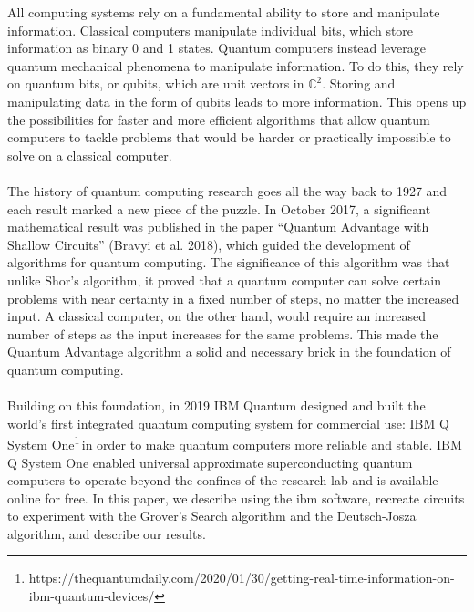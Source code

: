 \documentclass[12pt]{article}
\newcommand{\ibm}{\footnote{https://thequantumdaily.com/2020/01/30/getting-real-time-information-on-ibm-quantum-devices/}}
\begin{document}
    
    \noindent
    All computing systems rely on a fundamental ability to store and manipulate information. Classical computers manipulate individual bits, which store information as binary 0 and 1 states. Quantum computers instead leverage quantum mechanical phenomena to manipulate information. To do this, they rely on quantum bits, or qubits, which are unit vectors in $\mathbb{C}^2$. Storing and manipulating data in the form of qubits leads to more information. This opens up the possibilities for faster and more efficient algorithms that allow quantum computers to tackle problems that would be harder or practically impossible to solve on a classical computer.
    \\
    \smallskip
    \\
    The history of quantum computing research goes all the way back to 1927 and each result marked a new piece of the puzzle. In October 2017, a significant mathematical result was published in the paper “Quantum Advantage with Shallow Circuits” (Bravyi et al. 2018), which guided the development of algorithms for quantum computing. The significance of this algorithm was that unlike Shor’s algorithm, it proved that a quantum computer can solve certain problems with near certainty in a fixed number of steps, no matter the increased input. A classical computer, on the other hand,  would require an increased number of steps as the input increases for the same problems. This made the Quantum Advantage algorithm a solid and necessary brick in the foundation of quantum computing.
    \\
    \smallskip
    \\
    Building on this foundation, in 2019 IBM Quantum designed and built the world’s first integrated quantum computing system for commercial use: IBM Q System One\ibm\,in order to make quantum computers more reliable and stable. IBM Q System One enabled universal approximate superconducting quantum computers to operate beyond the confines of the research lab and is available online for free. In this paper, we describe using the ibm software, recreate circuits to experiment with the Grover’s Search algorithm and the Deutsch-Josza algorithm, and describe our results.
\end{document}
